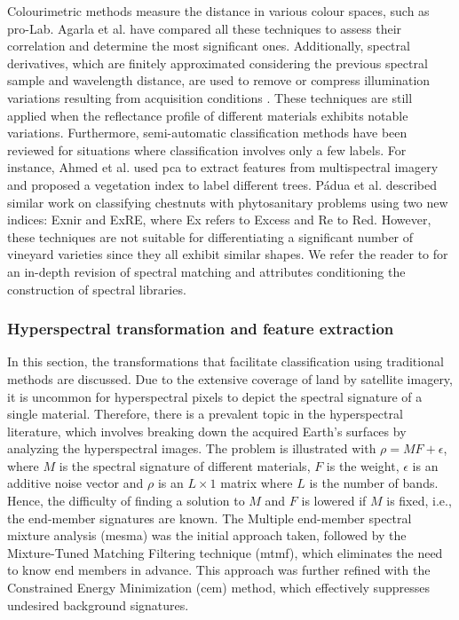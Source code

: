 Colourimetric methods measure the distance in various colour spaces, such as pro-Lab. Agarla et al. \cite{agarla_analysis_2021} have compared all these techniques to assess their correlation and determine the most significant ones. Additionally, spectral derivatives, which are finitely approximated considering the previous spectral sample and wavelength distance, are used to remove or compress illumination variations resulting from acquisition conditions \cite{fernandes_grapevine_2019, pu_hyperspectral_2017}. These techniques are still applied when the reflectance profile of different materials exhibits notable variations. Furthermore, semi-automatic classification methods have been reviewed for situations where classification involves only a few labels. For instance, Ahmed et al. \cite{ahmed_applied_2021} used \acrshort{pca} to extract features from multispectral imagery and proposed a vegetation index to label different trees. Pádua et al. \cite{padua_monitoring_2020} described similar work on classifying chestnuts with phytosanitary problems using two new indices: Ex\acrshort{nir} and ExRE, where Ex refers to Excess and Re to Red. However, these techniques are not suitable for differentiating a significant number of vineyard varieties since they all exhibit similar shapes. We refer the reader to \cite{shanmugam_spectral_2014} for an in-depth revision of spectral matching and attributes conditioning the construction of spectral libraries.

\subsubsection{Hyperspectral transformation and feature extraction}

In this section, the transformations that facilitate classification using traditional methods are discussed. Due to the extensive coverage of land by satellite imagery, it is uncommon for hyperspectral pixels to depict the spectral signature of a single material. Therefore, there is a prevalent topic in the hyperspectral literature, which involves breaking down the acquired Earth's surfaces by analyzing the hyperspectral images. The problem is illustrated with $\rho = \textit{MF} + \epsilon$, where $M$ is the spectral signature of different materials, $F$ is the weight, $\epsilon$ is an additive noise vector and $\rho$ is an $L \times 1$ matrix where $L$ is the number of bands. Hence, the difficulty of finding a solution to $M$ and $F$ is lowered if $M$ is fixed, i.e., the end-member signatures are known. The Multiple end-member spectral mixture analysis (\acrshort{mesma}) was the initial approach taken, followed by the Mixture-Tuned Matching Filtering technique (\acrshort{mtmf}), which eliminates the need to know end members in advance. This approach was further refined with the Constrained Energy Minimization (\acrshort{cem}) method, which effectively suppresses undesired background signatures.

